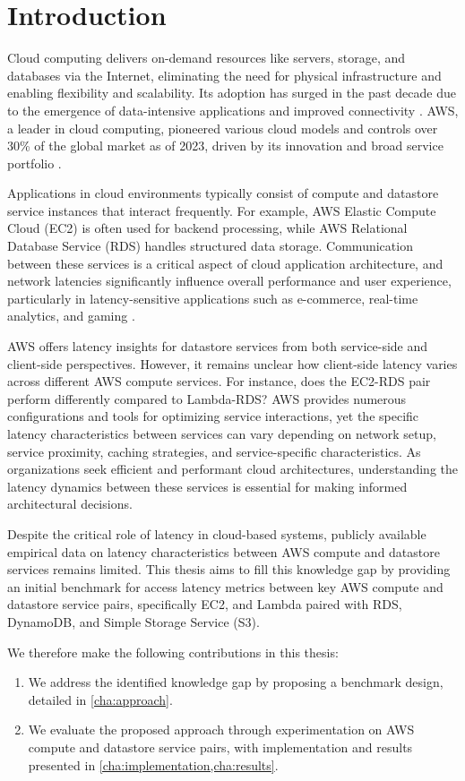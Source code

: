 \section{Introduction}
\label{cha:intro}

Cloud computing delivers on-demand resources like servers, storage, and databases via the Internet, eliminating the need for physical infrastructure and enabling flexibility and scalability. Its adoption has surged in the past decade due to the emergence of data-intensive applications and improved connectivity \cite{}. AWS, a leader in cloud computing, pioneered various cloud models and controls over 30\% of the global market as of 2023, driven by its innovation and broad service portfolio \cite{}.

Applications in cloud environments typically consist of compute and datastore service instances that interact frequently. For example, AWS Elastic Compute Cloud (EC2) is often used for backend processing, while AWS Relational Database Service (RDS) handles structured data storage. Communication between these services is a critical aspect of cloud application architecture, and network latencies significantly influence overall performance and user experience, particularly in latency-sensitive applications such as e-commerce, real-time analytics, and gaming \cite{}.

AWS offers latency insights for datastore services from both service-side and client-side perspectives. However, it remains unclear how client-side latency varies across different AWS compute services. For instance, does the EC2-RDS pair perform differently compared to Lambda-RDS? AWS provides numerous configurations and tools for optimizing service interactions, yet the specific latency characteristics between services can vary depending on network setup, service proximity, caching strategies, and service-specific characteristics. As organizations seek efficient and performant cloud architectures, understanding the latency dynamics between these services is essential for making informed architectural decisions.

Despite the critical role of latency in cloud-based systems, publicly available empirical data on latency characteristics between AWS compute and datastore services remains limited. This thesis aims to fill this knowledge gap by providing an initial benchmark for access latency metrics between key AWS compute and datastore service pairs, specifically EC2, and Lambda paired with RDS, DynamoDB, and Simple Storage Service (S3).

We therefore make the following contributions in this thesis:
\begin{enumerate}
	\item We address the identified knowledge gap by proposing a benchmark design, detailed in \cref{cha:approach}.
	\item We evaluate the proposed approach through experimentation on AWS compute and datastore service pairs, with implementation and results presented in \cref{cha:implementation,cha:results}.
\end{enumerate}